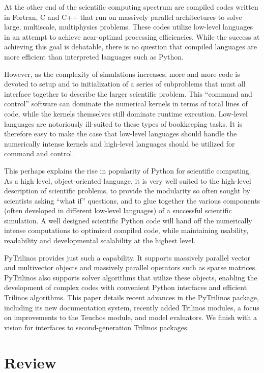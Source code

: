 \documentclass[11pt]{article}
\begin{document}
At the other end of the scientific computing spectrum are compiled codes written in Fortran, C and C++ that run on massively parallel architectures to solve large, multiscale, multiphysics problems.  These codes utilize low-level languages in an attempt to achieve near-optimal processing efficiencies.  While the success at achieving this goal is debatable, there is no question that compiled languages are more efficient than interpreted languages such as Python.

However, as the complexity of simulations increases, more and more code is devoted to setup and to initialization of a series of subproblems that must all interface together to describe the larger scientific problem.  This ``command and control'' software can dominate the numerical kernels in terms of total lines of code, while the kernels themselves still dominate runtime execution.  Low-level languages are notoriously ill-suited to these types of bookkeeping tasks.  It is therefore easy to make the case that low-level languages should handle the numerically intense kernels and high-level languages should be utilized for command and control.

This perhaps explains the rise in popularity of Python for scientific computing.  As a high level, object-oriented language, it is very well suited to the high-level description of scientific problems, to provide the modularity so often sought by scientists asking ``what if'' questions, and to glue together the various components (often developed in different low-level languages) of a successful scientific simulation.  A well designed scientific Python code will hand off the numerically intense computations to optimized compiled code, while maintaining usability, readability and developmental scalability at the highest level.

PyTrilinos provides just such a capability.  It supports massively parallel vector and multivector objects and massively parallel operators such as sparse matrices.  PyTrilinos also supports solver algorithms that utilize these objects, enabling the development of complex codes with convenient Python interfaces and efficient Trilinos algorithms.  This paper details recent advances in the PyTrilinos package, including its new documentation system, recently added Trilinos modules, a focus on improvements to the Teuchos module, and model evaluators.  We finish with a vision for interfaces to second-generation Trilinos packages.

\section{Review}
\label{sec:review}
\end{document}
